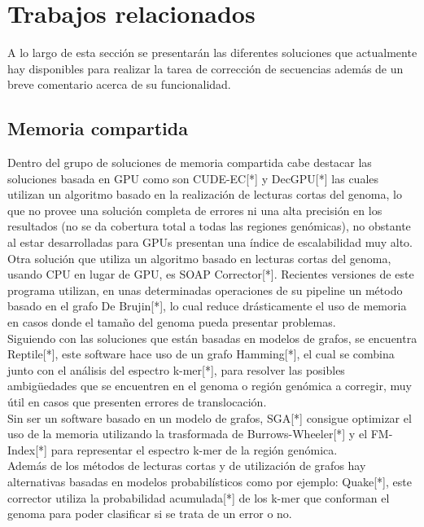 \documentclass[conference]{IEEEtran}
\begin{document}
\section{Trabajos relacionados}

A lo largo de esta sección se presentarán las diferentes soluciones que actualmente hay disponibles para realizar la tarea de corrección de secuencias además de un breve comentario acerca de su funcionalidad.

\subsection{Memoria compartida}

Dentro del grupo de soluciones de memoria compartida cabe destacar las soluciones basada en GPU como son CUDE-EC[*] y DecGPU[*] las cuales utilizan un algoritmo basado en la realización de lecturas cortas del genoma, lo que no provee una solución completa de errores ni una alta precisión en los resultados (no se da cobertura total a todas las regiones genómicas), no obstante al estar desarrolladas para GPUs presentan una índice de escalabilidad muy alto.\\

Otra solución que utiliza un algoritmo basado en lecturas cortas del genoma, usando CPU en lugar de GPU, es SOAP Corrector[*]. Recientes versiones de este programa utilizan, en unas determinadas operaciones de su pipeline un método basado en el grafo De Brujin[*], lo cual reduce drásticamente el uso de memoria en casos donde el tamaño del genoma pueda presentar problemas.\\

Siguiendo con las soluciones que están basadas en modelos de grafos, se encuentra Reptile[*], este software hace uso de un grafo Hamming[*], el cual se combina junto con el análisis del espectro k-mer[*], para resolver las posibles ambigüedades que se encuentren en el genoma o región genómica a corregir, muy útil en casos que presenten errores de translocación.\\

Sin ser un software basado en un modelo de grafos, SGA[*] consigue optimizar el uso de la memoria utilizando la trasformada de Burrows-Wheeler[*] y el FM-Index[*] para representar el espectro k-mer de la región genómica.\\

Además de los métodos de lecturas cortas y de utilización de grafos hay alternativas basadas en modelos probabilísticos como por ejemplo: Quake[*], este corrector utiliza la probabilidad acumulada[*] de los k-mer que conforman el genoma para poder clasificar si se trata de un error o no.\\
\end{document}
